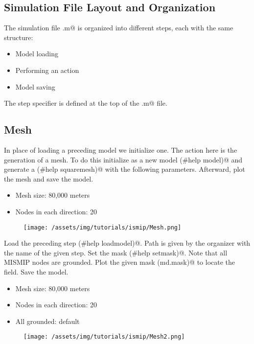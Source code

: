 \subsection{Simulation File Layout and Organization}  %
The simulation file \verb@runme.m@ is organized into different steps, each with the same structure:
\begin{itemize}
	\item Model loading
	\item Performing an action
	\item Model saving
\end{itemize}
The step specifier \verb@steps@ is defined at the top of the \verb@runme.m@ file.
\subsection{Mesh} %
In place of loading a preceding model we initialize one. The action here is the generation of a mesh. To do this initialize \verb@md@ as a new model \verb@(#help model)@ and generate a \verb@squaremesh@ \verb@(#help squaremesh)@ with the following parameters. Afterward, plot the mesh and save the model.
\begin{itemize}
	\item Mesh size: 80,000 meters
	\item Nodes in each direction: 20
\end{itemize}
\begin{figure}[H]
	\begin{center}
		\texttt{[image: /assets/img/tutorials/ismip/Mesh.png]}
	\end{center}
\end{figure}
Load the preceding step \verb@(#help loadmodel)@. Path is given by the organizer with the name of the given step. Set the mask \verb@(#help setmask)@. Note that all MISMIP nodes are grounded. Plot the given mask \verb@(md.mask)@ to locate the field. Save the model.
\begin{itemize}
	\item Mesh size: 80,000 meters
	\item Nodes in each direction: 20
	\item All grounded: default
		\end{itemize}
		\begin{figure}[H]
			\begin{center}
				\texttt{[image: /assets/img/tutorials/ismip/Mesh2.png]}
			\end{center}
		\end{figure}
